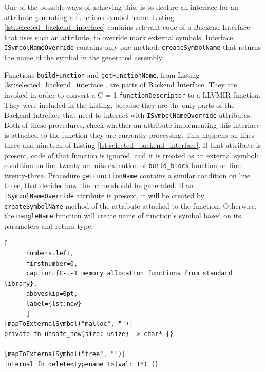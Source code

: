 One of the possible ways of achieving this, is to declare an interface for an attribute generating a functions symbol name.
Listing \ref{lst:selected_backend_interface} contains relevant code of a Backend Interface that uses such an attribute, to override mark external symbols.
Interface \lstinline{ISymbolNameOverride} contains only one method: \lstinline{createSymbolName} that returns the name of the symbol in the generated assembly.

Functions \lstinline{buildFunction} and \lstinline{getFunctionName}, from Listing \ref{lst:selected_backend_interface}, are parts of Backend Interface.
They are invoked in order to convert a C-=-1 \lstinline{functionDescriptor} to a LLVMIR function.
They were included in the Listing, because they are the only parts of the Backend Intreface that need to interact with \lstinline{ISymbolNameOverride} attributes.
Both of these procedures, check whether an attribute implementing this interface is attached to the function they are currently processing.
This happens on lines three and nineteen of Listing \ref{lst:selected_backend_interface}.
If that attribute is present, code of that function is ignored, and it is treated as an external symbol: condition on line twenty ommits execution of \lstinline{build_block} function on line twenty-three.
Procedure \lstinline{getFunctionName} contains a similar condition on line three, that decides how the name should be generated.
If an \lstinline{ISymbolNameOverride} attribute is present, it will be created by \lstinline{createSymbolName} method of the attribute attached to the function.
Otherwise, the \lstinline{mangleName} function will create name of function's symbol based on its parameters and return type.

\begin{minipage}{\linewidth}

	\begin{lstlisting}[
	  numbers=left,
	  firstnumber=0,
	  caption={C-=-1 memory allocation functions from standard library},
	  aboveskip=0pt,
	  label={lst:new}
	  ]
[mapToExternalSymbol("malloc", "")]
private fn unsafe_new(size: usize) -> char* {}

[mapToExternalSymbol("free", "")]
internal fn delete<typename T>(val: T*) {}

  \end{lstlisting}
\end{minipage}


